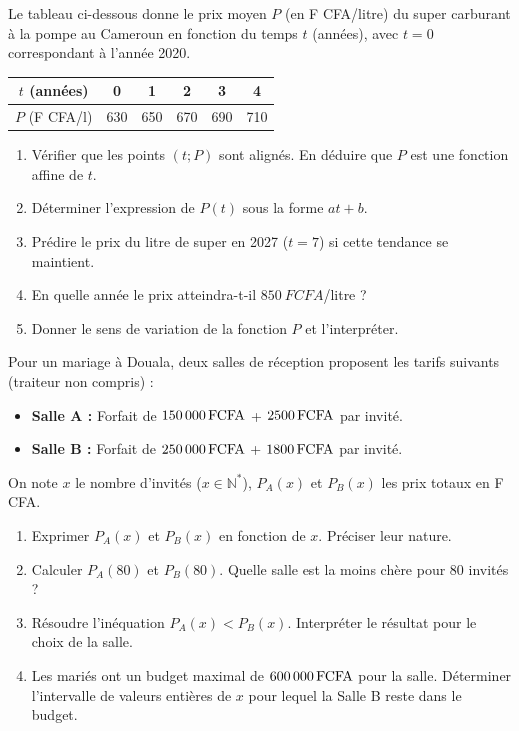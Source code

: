 \documentclass[11pt]{article}
\begin{document}
\begin{exercice}
Le tableau ci-dessous donne le prix moyen $P$ (en F CFA/litre) du super carburant à la pompe au Cameroun en fonction du temps $t$ (années), avec $t=0$ correspondant à l'année 2020.

\begin{center}
\begin{tabular}{|c|c|c|c|c|c|}
\hline
$t$ (années) & 0 & 1 & 2 & 3 & 4 \\
\hline
$P$ (F CFA/l) & 630 & 650 & 670 & 690 & 710 \\
\hline
\end{tabular}
\end{center}

\begin{enumerate}
    \item Vérifier que les points $(t ; P)$ sont alignés. En déduire que $P$ est une fonction affine de $t$.
    \item Déterminer l'expression de $P(t)$ sous la forme $at + b$.
    \item Prédire le prix du litre de super en 2027 ($t=7$) si cette tendance se maintient.
    \item En quelle année le prix atteindra-t-il $\SI{850}{F CFA}$/litre ?
    \item Donner le sens de variation de la fonction $P$ et l'interpréter.
\end{enumerate}
\end{exercice}

\begin{exercice}
Pour un mariage à Douala, deux salles de réception proposent les tarifs suivants (traiteur non compris) :
\begin{itemize}
    \item \textbf{Salle A :} Forfait de $\SI{150\,000}{F CFA}$ + $\SI{2\,500}{F CFA}$ par invité.
    \item \textbf{Salle B :} Forfait de $\SI{250\,000}{F CFA}$ + $\SI{1\,800}{F CFA}$ par invité.
\end{itemize}
On note $x$ le nombre d'invités ($x \in \mathbb{N}^*$), $P_A(x)$ et $P_B(x)$ les prix totaux en F CFA.
\begin{enumerate}
    \item Exprimer $P_A(x)$ et $P_B(x)$ en fonction de $x$. Préciser leur nature.
    \item Calculer $P_A(80)$ et $P_B(80)$. Quelle salle est la moins chère pour 80 invités ?
    \item Résoudre l'inéquation $P_A(x) < P_B(x)$. Interpréter le résultat pour le choix de la salle.
    \item Les mariés ont un budget maximal de $\SI{600\,000}{F CFA}$ pour la salle. Déterminer l'intervalle de valeurs entières de $x$ pour lequel la Salle B reste dans le budget.
\end{enumerate}
\end{exercice}
\end{document}
